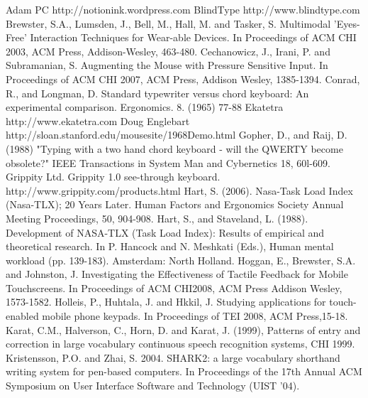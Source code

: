 \documentclass{chi2011}
\begin{document}












\begin{thebibliography}{9}
 Adam PC http://notionink.wordpress.com
 BlindType http://www.blindtype.com
 Brewster, S.A., Lumsden, J., Bell, M., Hall, M. and Tasker, S. Multimodal 'Eyes-Free' Interaction Techniques for Wear-able Devices. In Proceedings of ACM CHI 2003, ACM Press, Addison-Wesley, 463-480.
 Cechanowicz, J., Irani, P. and Subramanian, S. Augmenting the Mouse with Pressure Sensitive Input. In Proceedings of ACM CHI 2007, ACM Press, Addison Wesley, 1385-1394.
 Conrad, R., and Longman, D. Standard typewriter versus chord keyboard: An experimental comparison. Ergonomics. 8. (1965) 77-88
 Ekatetra http://www.ekatetra.com
 Doug Englebart \\http://sloan.stanford.edu/mousesite/1968Demo.html
 Gopher, D., and Raij, D. (1988) "Typing with a two hand chord keyboard - will the QWERTY become obsolete?" IEEE Transactions in System Man and Cybernetics 18, 60l-609. 
 Grippity Ltd. Grippity 1.0 see-through keyboard. http://www.grippity.com/products.html  
 Hart, S. (2006). Nasa-Task Load Index (Nasa-TLX); 20 Years Later. Human Factors and Ergonomics Society Annual Meeting Proceedings, 50, 904-908.
 Hart, S., and Staveland, L. (1988). Development of NASA-TLX (Task Load Index): Results of empirical and theoretical research. In P. Hancock and N. Meshkati (Eds.), Human mental workload (pp. 139-183). Amsterdam: North Holland.
 Hoggan, E., Brewster, S.A. and Johnston, J. Investigating the Effectiveness of Tactile Feedback for Mobile Touchscreens. In Proceedings of ACM CHI2008, ACM Press Addison Wesley, 1573-1582.
 Holleis, P., Huhtala, J. and Hkkil, J. Studying applications for touch-enabled mobile phone keypads. In Proceedings of TEI 2008, ACM Press,15-18.
 Karat, C.M., Halverson, C., Horn, D. and Karat, J. (1999), Patterns of entry and correction in large vocabulary continuous speech recognition systems, CHI 1999.
 Kristensson, P.O. and Zhai, S. 2004. SHARK2: a large vocabulary shorthand writing system for pen-based computers. In Proceedings of the 17th Annual ACM Symposium on User Interface Software and Technology (UIST '04).

\end{thebibliography}
\end{document}

